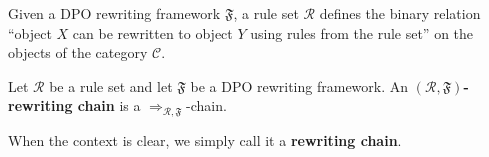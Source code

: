 Given a DPO rewriting framework \(\mathfrak{F}\), a rule set \(\mathcal{R}\) defines the binary relation \enquote{object $X$ can be rewritten to object $Y$ using rules from the rule set} on the objects of the category $\mathcal{C}$.
\begin{definition}\label{def:rewriting-chain}
Let \(\mathcal{R}\) be a rule set and let \(\mathfrak{F}\) be a DPO rewriting framework.
An \textbf{\((\mathcal{R},\mathfrak{F})\)-rewriting chain} is a \(\mathop{\Rightarrow}_{\mathcal{R},\mathfrak{F}}\)-chain.

When the context is clear, we simply call it a \textbf{rewriting chain}.
\end{definition}


